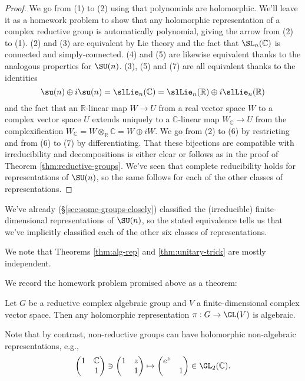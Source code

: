 \documentclass[reqno]{amsart} 
\begin{document}
\begin{proof}
  We go from (1) to (2) using that polynomials are holomorphic.  We'll leave it as a homework problem to show that any holomorphic representation of a complex reductive group is automatically polynomial, giving the arrow from (2) to (1).  (2) and (3) are equivalent by Lie theory and the fact that $\SL_n(\mathbb{C})$ is connected and simply-connected.  (4) and (5) are likewise equivalent thanks to the analogous properties for $\SU(n)$.  (3), (5) and (7) are all equivalent thanks to the identities
  \begin{equation}\label{eq:}
    \su(n) \oplus i \su(n) = \slLie_n(\mathbb{C})
    = \slLie_n(\mathbb{R}) \oplus i \slLie_n(\mathbb{R})
  \end{equation}
  and the fact that an $\mathbb{R}$-linear map $W \rightarrow U$ from a real vector space $W$ to a complex vector space $U$ extends uniquely to a $\mathbb{C}$-linear map $W_{\mathbb{C}} \rightarrow U$ from the complexification $W_{\mathbb{C}} = W \otimes_{\mathbb{R}} \mathbb{C} = W \oplus i W$.  We go from (2) to (6) by restricting and from (6) to (7) by differentiating.  That these bijections are compatible with irreducibility and decompositions is either clear or follows as in the proof of Theorem \ref{thm:reductive-groups}.  We've seen that complete reducibility holds for representations of $\SU(n)$, so the same follows for each of the other classes of representations.
\end{proof}

We've already (\S\ref{sec:some-groups-closely}) classified the (irreducible) finite-dimensional representations of $\SU(n)$, so the stated equivalence tells us that we've implicitly classified each of the other six classes of representations.

We note that Theorems \ref{thm:alg-rep} and \ref{thm:unitary-trick} are mostly independent.

We record the homework problem promised above as a theorem:
\begin{theorem}
  Let $G$ be a reductive complex algebraic group and $V$ a finite-dimensional complex vector space.  Then any holomorphic representation $\pi : G \rightarrow \GL(V)$ is algebraic.
\end{theorem}
Note that by contrast, non-reductive groups can have holomorphic non-algebraic representations, e.g.,
\begin{equation*}
  \begin{pmatrix}
    1 & \mathbb{C}  \\
    & 1
  \end{pmatrix}
  \ni
  \begin{pmatrix}
    1 & z \\
    & 1
  \end{pmatrix}
  \mapsto
  \begin{pmatrix}
    e^z &  \\
    & 1
  \end{pmatrix}
  \in \GL_2(\mathbb{C}).
\end{equation*}
\end{document}
